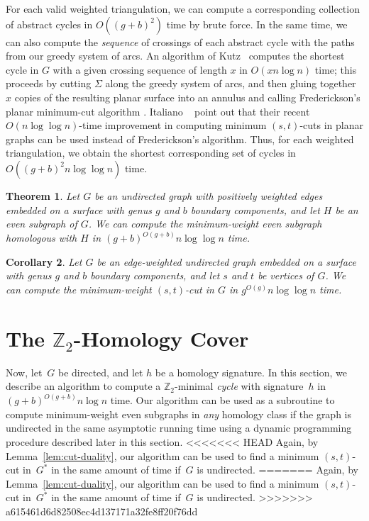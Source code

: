 \documentclass[11pt,twoside]{article}
\def\Z{\mathbb{Z}}
\newtheorem{theorem}{Theorem}[section]
\newtheorem{corollary}[theorem]{Corollary}
\begin{document}
For each valid weighted triangulation, we can compute a corresponding collection of abstract cycles in $O((g+b)^2)$ time by brute force.  In the same time, we can also compute the \emph{sequence} of crossings of each abstract cycle with the paths from our greedy system of arcs.  An algorithm of Kutz~\cite{k-csnco-06} computes the shortest cycle in $G$ with a given crossing sequence of length $x$ in $O(x n \log n)$ time; this proceeds by cutting $\Sigma$ along the greedy system of arcs, and then gluing together $x$ copies of the resulting planar surface into an annulus and calling Frederickson's planar minimum-cut algorithm \cite{f-faspp-87}.
Italiano \etal~\cite{insw-iamcmf-11} point out that their recent $O(n \log \log n)$-time improvement in computing minimum $(s,t)$-cuts in planar graphs can be used instead of Frederickson's algorithm. 
Thus, for each weighted triangulation, we obtain the shortest corresponding set of cycles in $O((g+b)^2 n \log \log n)$ time.

\begin{theorem}
Let $G$ be an undirected graph with positively weighted edges embedded on a surface with genus
$g$ and $b$ boundary components, and let $H$ be an even subgraph of $G$.
We can compute the minimum-weight even subgraph homologous with $H$ in
$(g+b)^{O(g+b)} n\log \log n$ time.
\end{theorem}

\begin{corollary}
Let $G$ be an edge-weighted undirected graph embedded on a surface with genus $g$ and $b$ boundary components, and let $s$ and $t$ be vertices of $G$.  We can compute the minimum-weight $(s,t)$-cut in $G$ in $g^{O(g)} n\log \log n$ time.
\end{corollary}

\section{The $\Z_2$-Homology Cover}
\label{sec:homcover}


Now, let~$G$ be directed,  and let $h$
be a homology signature.  In this section, we describe an
algorithm to compute a $\Z_2$-minimal \emph{cycle} with signature~$h$
in $(g+b)^{O(g+b)}n \log n$ time. Our algorithm can be
used as a subroutine to compute minimum-weight even subgraphs in
\emph{any} homology class if the graph is undirected in the same asymptotic running time
using a dynamic programming procedure described later in this section.
<<<<<<< HEAD
Again, by Lemma~\ref{lem:cut-duality}, our algorithm can be used to find a minimum $(s,t)$-cut in~$G^*$ in the same amount of time if~$G$ is undirected.
=======
Again, by Lemma~\ref{lem:cut-duality},  our algorithm can be used to find a minimum $(s,t)$-cut in~$G^*$ in the same amount of time if~$G$ is undirected.
>>>>>>> a615461d6d82508ec4d137171a32fe8ff20f76dd
\end{document}

